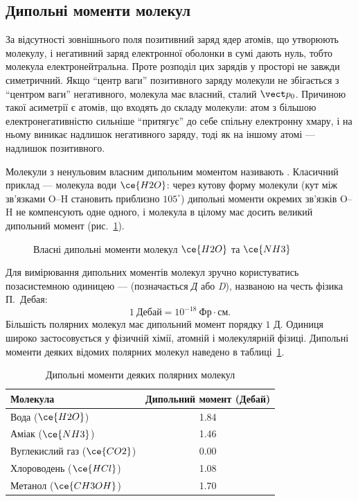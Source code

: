 \subsection*{Дипольні моменти молекул}

За відсутності зовнішнього поля позитивний заряд ядер атомів, що утворюють молекулу, і негативний заряд електронної оболонки в сумі дають нуль, тобто
молекула електронейтральна. Проте розподіл цих зарядів у просторі не завжди симетричний. Якщо \enquote{центр ваги} позитивного заряду молекули не збігається
з \enquote{центром ваги} негативного, молекула має власний, сталий  $\vect p_0$. Причиною такої асиметрії є  атомів, що входять до складу молекули: атом з більшою електронегативністю сильніше \enquote{притягує} до себе спільну електронну
хмару, і на ньому виникає надлишок негативного заряду, тоді як на іншому атомі --- надлишок позитивного.

Молекули з ненульовим власним дипольним моментом називають . Класичний приклад --- молекула води $\ce{H2O}$: через кутову форму
молекули (кут між зв'язками O--H становить приблизно $105^\circ$) дипольні моменти окремих зв'язків O--H не компенсують одне одного, і молекула в
цілому має досить великий дипольний момент (рис.~\ref{pic:MoleculeDipoles}).

\begin{figure}[h!]\centering
	\caption{Власні дипольні моменти молекул $\ce{H2O}$ та $\ce{NH3}$\label{pic:MoleculeDipoles}}
\end{figure}

Для вимірювання дипольних моментів молекул зручно користуватись позасистемною одиницею ---  (позначається \textit{Д} або \textit{D}),
названою на честь фізика П.~Дебая:
\begin{equation*}
	1\ \text{Дебай} = 10^{-18}\ \text{Фр}\cdot\text{см}.
\end{equation*}
Більшість полярних молекул має дипольний момент порядку $1$ Д. Одиниця широко застосовується у фізичній хімії, атомній і молекулярній фізиці.
Дипольні моменти деяких відомих полярних молекул наведено в таблиці~\ref{tab:dipoles}.

\begin{table}[h!]
	\centering
	\caption{Дипольні моменти деяких полярних молекул\label{tab:dipoles}}
	\begin{tabular}{lc}
		\toprule
		Молекула                    & Дипольний момент (Дебай) \\
		\midrule
		Вода ($\ce{H2O}$)           & 1.84                      \\
		Аміак ($\ce{NH3}$)          & 1.46                      \\
		Вуглекислий газ ($\ce{CO2}$) & 0.00                     \\
		Хлороводень ($\ce{HCl}$)    & 1.08                      \\
		Метанол ($\ce{CH3OH}$)      & 1.70                      \\
		\bottomrule
	\end{tabular}
\end{table}

